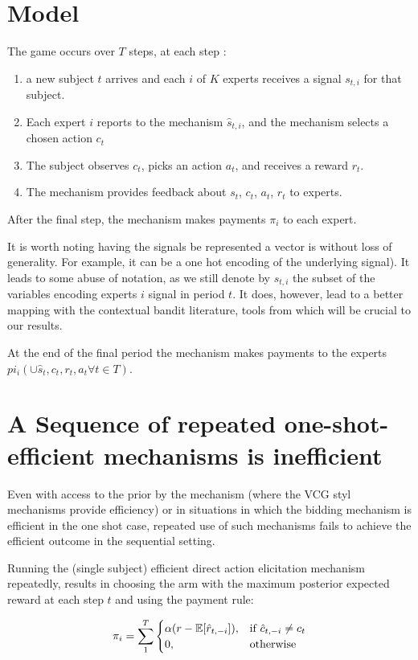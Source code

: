 \section{Model}

The game occurs over $T$ steps, at each step : 
\begin{enumerate}
\item a new subject $t$ arrives and each $i$ of $K$ experts receives a signal $s_{t,i}$ for that subject.
\item Each expert $i$ reports to the mechanism $\hat{s}_{t,i}$, and the mechanism selects a chosen action $c_t$
\item The subject observes $c_t$, picks an action $a_t$, and receives a reward $r_t$.
\item The mechanism provides feedback about $s_t$, $c_t$, $a_t$, $r_t$ to experts.
\end{enumerate}
After the final step, the mechanism makes payments $\pi_i$ to each expert.


It is worth noting having the signals be represented a vector is without loss of generality. For example, it can be a one hot encoding of the underlying signal). It leads to some abuse of notation, as we still denote by $s_{t,i}$ the subset of the variables encoding experts $i$ signal in period $t$. It does, however, lead to a better mapping with the contextual bandit literature, tools from which will be crucial to our results. 

At the end of the final period the mechanism makes payments to the experts $pi_i( \cup \hat{s}_t,c_t,r_t,a_t \forall t \in T)$.

\section{A Sequence of repeated one-shot-efficient mechanisms is inefficient}


Even with access to the prior by the mechanism (where the VCG styl mechanisms provide efficiency) or in situations in which the bidding mechanism is efficient in the one shot case, repeated use of such mechanisms fails to achieve the efficient outcome in the sequential setting. 

Running the (single subject) efficient direct action elicitation mechanism repeatedly, results in choosing the arm with the maximum posterior expected reward at each step $t$ and using the payment rule:

\[
    \pi_i = \sum_1^T 
\begin{cases}
    \alpha (r - \expec[\hat{r}_{t,-i}]) ,& \text{if } \hat{c}_{t,-i} \neq c_t\\
    0,              & \text{otherwise}
\end{cases}
\]

